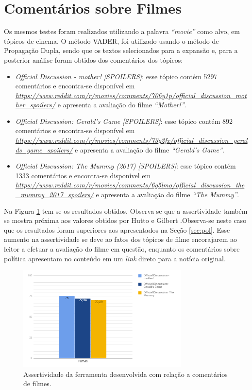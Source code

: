 \section{Comentários sobre Filmes}

Os mesmos testes foram realizados utilizando a palavra \textit{``movie''} como
alvo, em tópicos de cinema. O método \ac{VADER}, foi utilizado usando o método
de Propagação Dupla, sendo que os textos selecionados para a expansão e, para a
posterior análise foram obtidos dos comentários dos tópicos:

\begin{itemize}
  \item
  \textit{Official Discussion - mother! [SPOILERS]}: esse tópico contém 5297
  comentários e encontra-se disponível em
  \textit{\url{https://www.reddit.com/r/movies/comments/706y1p/official_discussion_mother_spoilers/}}
  e apresenta a avaliação do filme \textit{``Mother!''}.
  \item
  \textit{Official Discussion: Gerald's Game [SPOILERS]}: esse tópico contém 892
  comentários e
  encontra-se disponível em
  \textit{\url{https://www.reddit.com/r/movies/comments/73g2fx/official_discussion_geralds_game_spoilers/}}
  e apresenta a avaliação do filme \textit{``Gerald's Game''}.
    \item
  \textit{Official Discussion: The Mummy (2017) [SPOILERS]}: esse tópico contém
  1333 comentários e
  encontra-se disponível em
  \textit{\url{https://www.reddit.com/r/movies/comments/6g5lmo/official_discussion_the_mummy_2017_spoilers/}}
  e apresenta a avaliação do filme \textit{``The Mummy''}.
  
\end{itemize}


Na Figura \ref{fig:fil1} tem-se os resultados obtidos. Observa-se que a
assertividade também se mostra próxima aos valores obtidos por Hutto e Gilbert
\cite{conf/icwsm/HuttoG14}.Observa-se neste caso que os resultados foram
superiores aos apresentados na Seção \ref{sec:pol}. Esse aumento na
assertividade se deve ao fatos dos tópicos de filme encorajarem ao
leitor a efetuar a avaliação do filme em questão, enquanto os comentários sobre
política apresentam no conteúdo em um \textit{link} direto para a notícia
original.

\begin{figure}[!htbp]
\centering
\includegraphics[height=200px]{imagens/filmes1.png}
\caption{Assertividade da ferramenta desenvolvida com relação a comentários de
filmes.}
\label{fig:fil1}
\end{figure}


